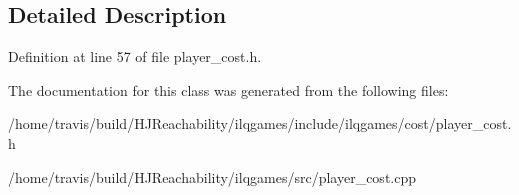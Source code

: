 \subsection{Detailed Description}


Definition at line 57 of file player\+\_\+cost.\+h.



The documentation for this class was generated from the following files\+:\begin{DoxyCompactItemize}
\item 
/home/travis/build/\+H\+J\+Reachability/ilqgames/include/ilqgames/cost/player\+\_\+cost.\+h\item 
/home/travis/build/\+H\+J\+Reachability/ilqgames/src/player\+\_\+cost.\+cpp\end{DoxyCompactItemize}
